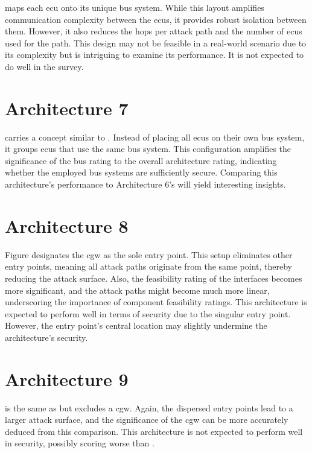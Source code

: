  maps each \acrshort{ecu} onto its unique bus system. 
While this layout amplifies communication complexity between the \acrshort{ecu}s, it provides robust isolation between them. 
However, it also reduces the hops per attack path and the number of \acrshort{ecu}s used for the path. 
This design may not be feasible in a real-world scenario due to its complexity but is intriguing to examine its performance. 
It is not expected to do well in the survey.

\section{Architecture 7}
\label{subsec:arch7}

 carries a concept similar to . 
Instead of placing all \acrshort{ecu}s on their own bus system, it groups \acrshort{ecu}s that use the same bus system.
This configuration amplifies the significance of the bus rating to the overall architecture rating, 
indicating whether the employed bus systems are sufficiently secure. 
Comparing this architecture's performance to Architecture 6's will yield interesting insights.
\section{Architecture 8}
\label{subsec:arch8}

Figure  designates the \acrshort{cgw} as the sole entry point. 
This setup eliminates other entry points, meaning all attack paths originate from the same point, thereby reducing the attack surface. 
Also, the feasibility rating of the interfaces becomes more significant, 
and the attack paths might become much more linear, underscoring the importance of component feasibility ratings. 
This architecture is expected to perform well in terms of security due to the singular entry point. 
However, the entry point's central location may slightly undermine the architecture's security.

\section{Architecture 9}
\label{subsec:arch9}

 is the same as  but excludes a \acrshort{cgw}. 
Again, the dispersed entry points lead to a larger attack surface, and the significance of the \acrshort{cgw} 
can be more accurately deduced from this comparison. 
This architecture is not expected to perform well in security, possibly scoring worse than .
